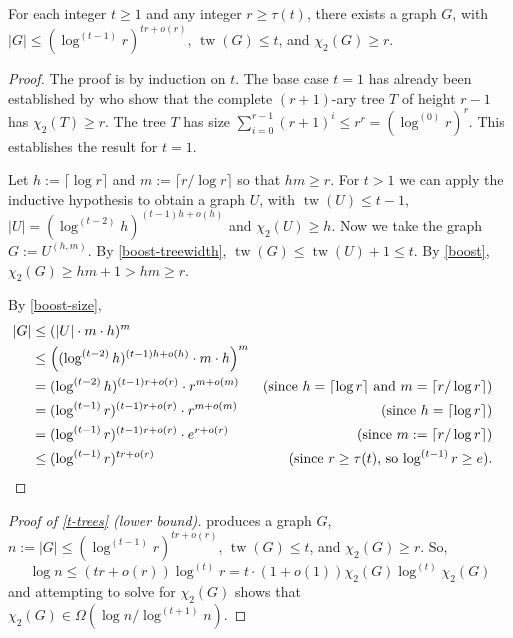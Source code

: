 \documentclass[kpfonts]{patmorin}
\DeclareMathOperator{\tw}{tw}
\newcommand{\trn}{\chi_2}
\theoremstyle{named}
\begin{document}
\begin{lem}\label{treewidth-lower-bound}
    For each integer $t\ge 1$ and any integer $r\ge \tau(t)$, there exists a graph $G$, with $|G|\le (\log^{(t-1)}r)^{tr + o(r)}$, $\tw(G)\le t$, and $\trn(G)\ge r$.
\end{lem}

\begin{proof}
    The proof is by induction on $t$.  The base case $t=1$ has already been established by \citet{karpas.neiman.ea:on} who show that the complete $(r+1)$-ary tree $T$ of height $r-1$ has $\trn(T)\ge r$.  The tree $T$ has size $\sum_{i=0}^{r-1} (r+1)^i \le r^r=(\log^{(0)}r)^{r}$.  This establishes the result for $t=1$.

    Let $h:=\lceil\log r\rceil$ and $m:=\lceil r/\log r\rceil$ so that $hm\ge r$.  For $t>1$ we can apply the inductive hypothesis to obtain a graph $U$, with $\tw(U)\le t-1$, $|U|=(\log^{(t-2)} h)^{(t-1)h+o(h)}$ and $\trn(U)\ge h$.
    Now we take the graph $G:=U^{(h,m)}$.  By \cref{boost-treewidth}, $\tw(G)\le \tw(U)+1\le t$.  By \cref{boost},
    $\trn(G)\ge hm+1 > hm \ge r$.

    By \cref{boost-size},
    \begin{align*}
        |G| & \le (|U|\cdot m\cdot h)^{m} \\
        & \le \left((\log^{(t-2)} h)^{(t-1)h + o(h)}\cdot m\cdot h\right)^{m} \\
        & = (\log^{(t-2)} h)^{(t-1)r + o(r)}\cdot r^{m+o(m)}
        & \text{(since $h=\lceil\log r\rceil$ and $m=\lceil r/\log r\rceil$)}\\
        & = (\log^{(t-1)} r)^{(t-1)r + o(r)}\cdot r^{m+o(m)}
         & \text{(since $h=\lceil\log r\rceil$)} \\
        & = (\log^{(t-1)} r)^{(t-1)r + o(r)}\cdot e^{r+o(r)}
        & \text{(since $m:=\lceil r/\log r\rceil$)}\\
        & \le (\log^{(t-1)} r)^{tr + o(r)} & \text{(since $r\ge \tau(t)$, so $\log^{(t-1)} r\ge e$).} & \qedhere
    \end{align*}
\end{proof}

\begin{proof}[Proof of \cref{t-trees} (lower bound)]
     produces a graph $G$, $n:=|G|\le (\log^{(t-1)} r)^{tr+o(r)}$, $\tw(G)\le t$, and $\trn(G)\ge r$.  So,
    \[
        \log n \le (tr+o(r))\log^{(t)} r
        = t\cdot(1+o(1))\trn(G)\log^{(t)} \trn(G)
    \]
    and attempting to solve for $\trn(G)$ shows that $\trn(G)\in \Omega(\log n/\log^{(t+1)} n)$.
\end{proof}
\end{document}
